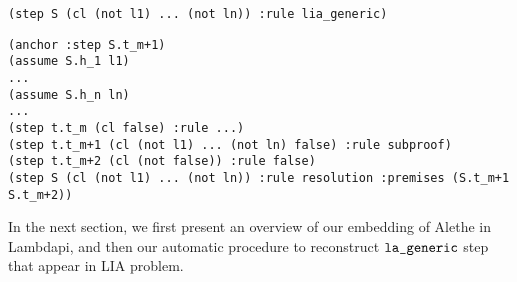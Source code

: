 \begin{lstlisting}[language=SMT]
(step S (cl (not l1) ... (not ln)) :rule lia_generic)
\end{lstlisting}

\begin{center}
\lightning
\end{center}

\begin{lstlisting}[language=SMT,caption={Elaboration of $\tt{lia\_generic}$},label={lst:elab_lia}]
(anchor :step S.t_m+1)
(assume S.h_1 l1)
...
(assume S.h_n ln)
...
(step t.t_m (cl false) :rule ...)
(step t.t_m+1 (cl (not l1) ... (not ln) false) :rule subproof)
(step t.t_m+2 (cl (not false)) :rule false)
(step S (cl (not l1) ... (not ln)) :rule resolution :premises (S.t_m+1 S.t_m+2))
\end{lstlisting}

In the next section, we first present an overview of our embedding of Alethe in Lambdapi, and then our automatic procedure to reconstruct $\tt{la\_generic}$ step that appear in LIA problem.
